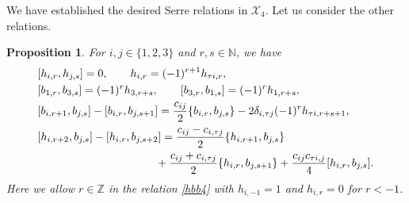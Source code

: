 \documentclass[11pt,reqno]{amsart}
\numberwithin{equation}{section}
\newtheorem{prop}[thm]{Proposition}
\theoremstyle{definition}
\theoremstyle{remark}
\newcommand{\bZ}{\mathbb{Z}}
\newcommand{\bN}{\mathbb{N}}
\newcommand{\scrX}{{\mathscr{X}}}
\def \X{b}
\begin{document}
We have established the desired Serre relations in $\scrX_4$. Let us consider the other relations.

\begin{prop}\label{X=4prop}
For $i,j\in\{1,2,3\}$ and $r,s\in\bN$, we have 
\begin{align}
&[h_{i,r},h_{j,s}]=0,\qquad h_{i,r}=(-1)^{r+1}h_{\tau i,r},\label{hhb4}\\
&[\X_{1,r},\X_{3,s}]=  (-1)^{r}h_{3,r+s}, \qquad [\X_{3,r},\X_{1,s}]=  (-1)^{r}h_{1,r+s},   
\label{bbb4-}
\\
&[b_{i,r+1},b_{j,s}]  - [b_{i,r },b_{j,s+1 }]  =\frac{c_{ij}}{2}\{b_{i,r },b_{j,s}\}-2\delta_{i,\tau j} (-1)^{r}h_{\tau i,r+s+1 },\label{bbb4}\\
&[h_{i,r+2},b_{j,s}] - [h_{i,r},b_{j,s+2}]=\frac{c_{ij}-c_{i,\tau j}}{2}\{h_{i,r+1},b_{j,s}\}\notag\\
&\qquad\qquad\qquad \qquad \qquad \ \  +\frac{c_{ij}+c_{i,\tau j}}{2} \{h_{i,r},b_{j,s+1}\}+\frac{c_{ij}c_{\tau i,j}}{4} [h_{i,r}, b_{j,s}].\label{hbb4}
\end{align}
Here we allow $r\in\bZ$ in the relation \eqref{hbb4} with $h_{i,-1}=1$ and $h_{i,r}=0$ for $r<-1$.
\end{prop}
\end{document}
